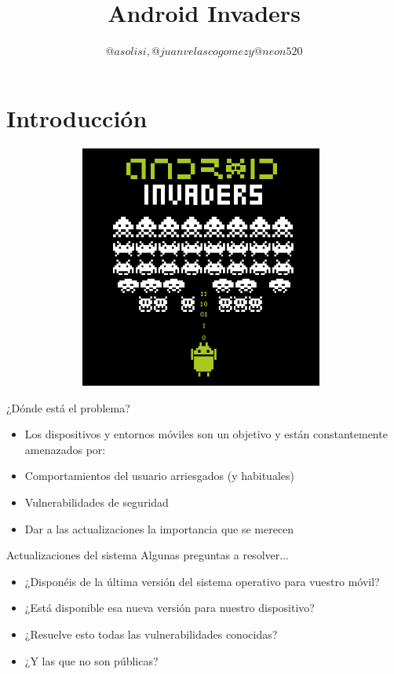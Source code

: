 \documentclass{beamer}
\title[Charla Android]{Android Invaders}
\author[LPB]{$@asolisi, @juanvelascogomez y @neon520$}
\institute[UGR]{Universidad de Granada}
\begin{document}
\maketitle

\section*{Introducción}

\begin{figure}[h]
\includegraphics[width=11cm, height=8cm]{androidInvaders.png}
\end{figure}

\begin{frame}{¿Dónde está el problema?}
\begin{itemize}[<+-|alert@+>]
	
\item Los dispositivos y entornos móviles son un objetivo y están constantemente amenazados por:
\item Comportamientos del usuario arriesgados (y habituales)
\item Vulnerabilidades de seguridad
\item Dar a las actualizaciones la importancia que se merecen

\end{itemize}
\end{frame}

\begin{frame}{Actualizaciones del sistema}
	Algunas preguntas a resolver...
	
\begin{itemize}[<+-|alert@+>]
	
	\item ¿Disponéis de la última versión del sistema operativo para vuestro móvil?
	\item ¿Está disponible esa nueva versión para nuestro dispositivo?
	\item ¿Resuelve esto todas las vulnerabilidades conocidas?
	\item ¿Y las que no son públicas?
	
\end{itemize}
\end{frame}
\end{document}
